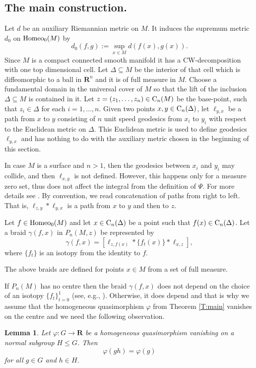 \documentclass[11pt]{amsart}
\newtheorem{lemma}[subsection]{Lemma}
\theoremstyle{definition}
\theoremstyle{remark}
\numberwithin{equation}{section}
\numberwithin{figure}{section}
\newcommand{\B}[1]{{\mathbf #1}}
\begin{document}
\subsection*{The main construction.}
Let $d$ be an auxiliary Riemannian metric on $M$. It induces the supremum metric $d_0$ on ${\rm Homeo}_0(M)$ by 
$$ 
d_0(f,g):=\sup_{x\in M}d(f(x),g(x)).  
$$
Since $M$ is a compact connected smooth manifold it has a CW-decomposition with one top
dimensional cell. Let $\Delta\subseteq M$ be the interior of that cell
which is diffeomorphic to a ball in $\B R^n$ and it is of full measure in $M$.  
Choose a fundamental domain in
the universal cover of $M$ so that the lift of the inclusion $\Delta\subseteq
M$ is contained in it. 
Let $z=(z_1,\ldots,z_n)\in {\rm C}_n(M)$ be the base-point, such that
$z_i\in \Delta$ for each $i=1,\ldots,n$. 
Given two points $x,y\in {\rm C}_n(\Delta)$,
let $\ell_{y,x}$ be a path from $x$ to $y$ consisting of $n$
unit speed geodesics from $x_i$ to $y_i$ with respect to the Euclidean
metric on $\Delta$. This Euclidean metric is
used to define geodesics $\ell_{y,x}$ and has nothing to do with the
auxiliary metric chosen in the beginning of this section.

In case $M$ is a surface and $n>1$, 
then the geodesics between $x_i$ and $y_i$ may collide, 
and then $\ell_{x,y}$ is not defined. However, this happens only for a measure zero set, thus does not affect the integral from the definition of $\Psi$. For more details see \cite[Section 3.2]{GambaudoPecou}.
By convention, we read concatenation of paths from right to left. That
is, $\ell_{z,y}*\ell_{y,x}$ is a path from $x$ to $y$ and then to $z$.

Let $f\in {\rm Homeo}_0(M)$ and let $x\in {\rm C}_n(\Delta)$ be a point such that 
$f(x)\in {\rm C}_n(\Delta)$. Let a braid $\gamma(f,x)$ in $P_n(M,z)$ be 
represented by
\begin{equation}
\gamma(f,x) = \left[ \ell_{z,f(x)}*\{f_t(x)\}*\ell_{x,z} \right],
\label{Eq:gfz1}
\end{equation}
where $\{f_t\}$ is an isotopy from the identity to $f$. 

The above braids are defined for points $x\in M$ from a set of full measure.

If $P_n(M)$ has no centre then the braid $\gamma(f,x)$ does not depend on the choice
of an isotopy $\{f_t\}_{t=0}^1$ (see, e.g., \cite[Section 2.2 (6),(7)]{BK-frag}). 
Otherwise, it does depend and that is why we assume that
the homogeneous quasimorphism $\varphi$ from Theorem \ref{T:main} vanishes on the centre
and we need the following observation.\\
\begin{lemma}\label{L:normal}
Let $\varphi\colon G\to \B R$ be a homogeneous quasimorphism vanishing
on a normal subgroup $H\leq G$. Then
$$
\varphi(gh) = \varphi(g)
$$
for all $g\in G$ and $h\in H$.
\end{lemma}
\end{document}
